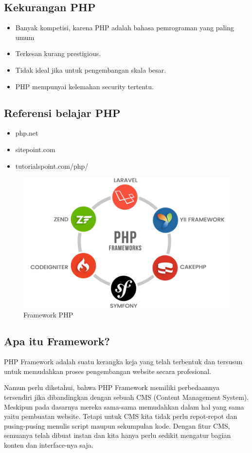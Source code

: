 \begin{enumerate}
\subsection{Kekurangan PHP}
\begin{itemize}
	\item Banyak kompetisi, karena PHP adalah bahasa pemrograman yang paling umum
	\item Terkesan kurang prestigious.
	\item Tidak ideal jika untuk pengembangan skala besar.
	\item PHP mempunyai kelemahan security tertentu.
\end{itemize}

\subsection{Referensi belajar PHP}
\begin{itemize}
	\item php.net
	\item sitepoint.com
	\item tutorialspoint.com/php/
\end{itemize}

	\begin{figure}[H]
		\includegraphics[width=12cm]{figures/web/phpframework.png}
		\centering
		\caption{Framework PHP}
	\end{figure}
\subsection{Apa itu Framework?}
PHP Framework adalah suatu kerangka keja yang telah terbentuk dan tersusun untuk memudahkan proses pengembangan website  secara profesional.

Namun perlu diketahui, bahwa PHP Framework memiliki perbedaannya tersendiri jika dibandingkan dengan sebuah CMS (Content Management System). Meskipun pada dasarnya mereka sama-sama memudahkan dalam hal yang sama yaitu pembuatan website. Tetapi untuk CMS  kita tidak perlu repot-repot dan pusing-pusing menulis script maupun sekumpulan kode. Dengan fitur CMS, semuanya telah dibuat instan dan kita hanya perlu sedikit mengatur bagian konten dan interface-nya saja.


\end{enumerate}
